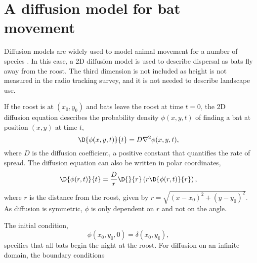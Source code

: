 \section{A diffusion model for bat movement} \label{diffusion}

Diffusion models are widely used to model animal movement for a number of
species \cite{Ovaskainen2016}. In this case, a 2D diffusion model is used to
describe dispersal as bats fly away from the roost. The third dimension is not
included as height is not measured in the radio tracking survey, and it is not
needed to describe landscape use.

If the roost is at $(x_0,y_0)$ and bats leave the roost at time $t =0$,
the 2D diffusion equation describes the probability density $\phi(x,y,t)$ of
finding a bat at position $(x,y)$ at time $t$,
%
\begin{equation}
  \D{\phi(x,y,t)}{t} = D \nabla^2 \phi(x,y,t) ,
  \label{eqn:diffusion_cartesian}
\end{equation}
%
where $D$ is the diffusion coefficient, a positive constant that quantifies the rate of spread.
%
The diffusion equation can also be written in polar coordinates,
%
\begin{equation}
\D{ \phi(r,t)}{t} = \frac{D}{r} \D{}{ r} \left( r \D{\phi(r,t)}{r} \right),
\label{eqn:diffusion_polar}
\end{equation}
%
where $r$ is the distance from the roost, given by $r=\sqrt{(x-x_0)^2 +
(y-y_0)^2}$. As diffusion is symmetric, $\phi$ is only dependent on $r$ and not
 on the angle.

The initial condition,
%
\begin{equation}
\phi(x_0,y_0,0) = \delta(x_0,y_0),
\label{eqn:IC}
\end{equation}
%
specifies that all bats begin the night at the roost. For diffusion on an
infinite domain, the boundary conditions

